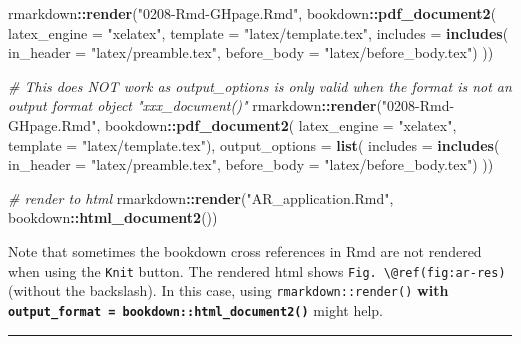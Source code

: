 \documentclass[
  a4paper,
  twoside,
  openright]{book}
\newenvironment{Shaded}{\begin{snugshade}}{\end{snugshade}}
\newcommand{\AttributeTok}[1]{\textcolor[rgb]{0.13,0.29,0.53}{#1}}
\newcommand{\CommentTok}[1]{\textcolor[rgb]{0.56,0.35,0.01}{\textit{#1}}}
\newcommand{\FunctionTok}[1]{\textcolor[rgb]{0.13,0.29,0.53}{\textbf{#1}}}
\newcommand{\NormalTok}[1]{#1}
\newcommand{\SpecialCharTok}[1]{\textcolor[rgb]{0.81,0.36,0.00}{\textbf{#1}}}
\newcommand{\StringTok}[1]{\textcolor[rgb]{0.31,0.60,0.02}{#1}}
\theoremstyle{definition}
\theoremstyle{definition}
\theoremstyle{definition}
\theoremstyle{definition}
\theoremstyle{remark}
\begin{document}
\begin{Shaded}
\begin{Highlighting}[]
\NormalTok{rmarkdown}\SpecialCharTok{::}\FunctionTok{render}\NormalTok{(}\StringTok{"0208{-}Rmd{-}GHpage.Rmd"}\NormalTok{, }
\NormalTok{    bookdown}\SpecialCharTok{::}\FunctionTok{pdf\_document2}\NormalTok{(}
        \AttributeTok{latex\_engine =} \StringTok{"xelatex"}\NormalTok{,}
        \AttributeTok{template =} \StringTok{"latex/template.tex"}\NormalTok{,}
        \AttributeTok{includes =} \FunctionTok{includes}\NormalTok{(}
            \AttributeTok{in\_header =} \StringTok{"latex/preamble.tex"}\NormalTok{,}
            \AttributeTok{before\_body =} \StringTok{"latex/before\_body.tex"}\NormalTok{)}
\NormalTok{        ))}

\CommentTok{\# This does NOT work as \textasciigrave{}output\_options\textasciigrave{} is only valid when the format is not an output format object "xxx\_document()"}
\NormalTok{rmarkdown}\SpecialCharTok{::}\FunctionTok{render}\NormalTok{(}\StringTok{"0208{-}Rmd{-}GHpage.Rmd"}\NormalTok{, }
\NormalTok{    bookdown}\SpecialCharTok{::}\FunctionTok{pdf\_document2}\NormalTok{(}
        \AttributeTok{latex\_engine =} \StringTok{"xelatex"}\NormalTok{,}
        \AttributeTok{template =} \StringTok{"latex/template.tex"}\NormalTok{), }
    \AttributeTok{output\_options =} \FunctionTok{list}\NormalTok{(}
        \AttributeTok{includes =} \FunctionTok{includes}\NormalTok{(}
            \AttributeTok{in\_header =} \StringTok{"latex/preamble.tex"}\NormalTok{,}
            \AttributeTok{before\_body =} \StringTok{"latex/before\_body.tex"}\NormalTok{)}
\NormalTok{        ))}

\CommentTok{\# render to html}
\NormalTok{rmarkdown}\SpecialCharTok{::}\FunctionTok{render}\NormalTok{(}\StringTok{"AR\_application.Rmd"}\NormalTok{,  bookdown}\SpecialCharTok{::}\FunctionTok{html\_document2}\NormalTok{())}
\end{Highlighting}
\end{Shaded}

Note that sometimes the bookdown cross references in Rmd are not rendered when using the \texttt{Knit} button. The rendered html shows \texttt{Fig.\ \textbackslash{}@ref(fig:ar-res)} (without the backslash). In this case, using \texttt{rmarkdown::render()} \textbf{with \texttt{output\_format\ =\ bookdown::html\_document2()}} might help.

\begin{center}\rule{0.5\linewidth}{0.5pt}\end{center}
\end{document}
